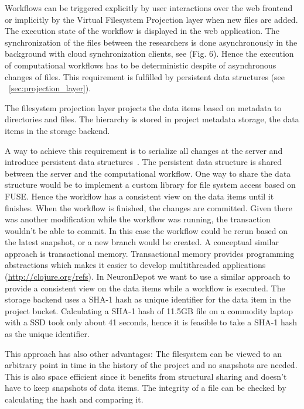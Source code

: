 \documentclass{frontiersSCNS} %
\begin{document}
Workflows can be triggered explicitly by user interactions over the web
frontend or implicitly by the Virtual Filesystem Projection layer when new
files are added. The execution state of the workflow is displayed in the web
application. The synchronization of the files between the researchers is done
asynchronously in the background with cloud synchronization clients, see (Fig.
6). Hence the execution of computational workflows  has to be deterministic
despite of asynchronous changes of files. This requirement is fulfilled by
persistent data structures (see ~\ref{sec:projection_layer}).

The filesystem projection layer projects the data items based on metadata to
directories and files. The hierarchy is stored in project metadata storage, the
data items in the storage backend.

A way to achieve this requirement is to serialize all changes at the server and
introduce persistent data structures~\cite{Driscoll1989}. The persistent data
structure is shared between the server and the computational workflow. One way
to share the data structure would be to implement a custom library for file
system access based on FUSE. Hence the workflow has a consistent view on the
data items until it finishes. When the workflow is finished, the changes are
committed. Given there was another modification while the workflow was running,
the transaction wouldn’t be able to commit. In this case the workflow could be
rerun based on the latest snapshot, or a new branch would be created. A
conceptual similar approach is transactional memory. Transactional memory
provides programming abstractions which makes it easier to develop
multithreaded applications (\url{http://clojure.org/refs}). In NeuronDepot we
want to use a similar approach to provide a consistent view on the data items
while a workflow is executed. The storage backend uses a SHA-1 hash as unique
identifier for the data item in the project bucket. Calculating a SHA-1 hash of
11.5GB file on a commodity laptop with a SSD took only about 41 seconds, hence
it is feasible to take a SHA-1 hash as the unique identifier.

This approach has also other advantages: The filesystem can be viewed to an
arbitrary point in time in the history of the project and no snapshots are
needed. This is also space efficient since it benefits from structural sharing
and doesn't have to keep snapshots of data items. The integrity of a file can
be checked by calculating the hash and comparing it.
\end{document}

